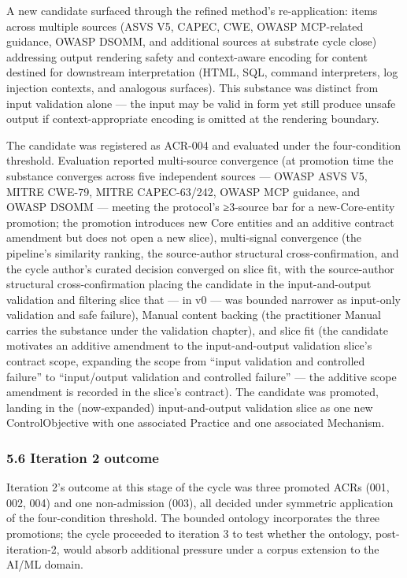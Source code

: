 \documentclass[
]{article}
\begin{document}
A new candidate surfaced through the refined method's re-application:
items across multiple sources (ASVS V5, CAPEC, CWE, OWASP MCP-related
guidance, OWASP DSOMM, and additional sources at substrate cycle close)
addressing output rendering safety and context-aware encoding for
content destined for downstream interpretation (HTML, SQL, command
interpreters, log injection contexts, and analogous surfaces). This
substance was distinct from input validation alone --- the input may be
valid in form yet still produce unsafe output if context-appropriate
encoding is omitted at the rendering boundary.

The candidate was registered as ACR-004 and evaluated under the
four-condition threshold. Evaluation reported multi-source convergence
(at promotion time the substance converges across five independent
sources --- OWASP ASVS V5, MITRE CWE-79, MITRE CAPEC-63/242, OWASP MCP
guidance, and OWASP DSOMM --- meeting the protocol's ≥3-source bar for a
new-Core-entity promotion; the promotion introduces new Core entities
and an additive contract amendment but does not open a new slice),
multi-signal convergence (the pipeline's similarity ranking, the
source-author structural cross-confirmation, and the cycle author's
curated decision converged on slice fit, with the source-author
structural cross-confirmation placing the candidate in the
input-and-output validation and filtering slice that --- in v0 --- was
bounded narrower as input-only validation and safe failure), Manual
content backing (the practitioner Manual carries the substance under the
validation chapter), and slice fit (the candidate motivates an additive
amendment to the input-and-output validation slice's contract scope,
expanding the scope from ``input validation and controlled failure'' to
``input/output validation and controlled failure'' --- the additive
scope amendment is recorded in the slice's contract). The candidate was
promoted, landing in the (now-expanded) input-and-output validation
slice as one new ControlObjective with one associated Practice and one
associated Mechanism.

\subsubsection{5.6 Iteration 2 outcome}\label{iteration-2-outcome}

Iteration 2's outcome at this stage of the cycle was three promoted ACRs
(001, 002, 004) and one non-admission (003), all decided under symmetric
application of the four-condition threshold. The bounded ontology
incorporates the three promotions; the cycle proceeded to iteration 3 to
test whether the ontology, post-iteration-2, would absorb additional
pressure under a corpus extension to the AI/ML domain.
\end{document}
